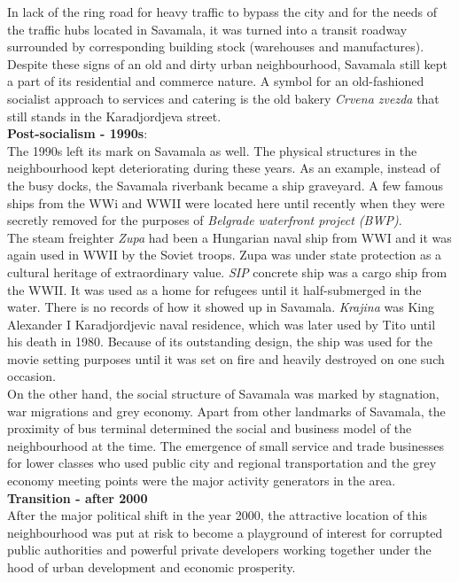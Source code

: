 \documentclass[11pt]{report}
\begin{document}
In lack of the ring road for heavy traffic to bypass the city and for the needs of the traffic hubs located in Savamala, it was turned into a transit roadway surrounded by corresponding building stock (warehouses and manufactures).
Despite these signs of an old and dirty urban neighbourhood, Savamala still kept a part of its residential and commerce nature.
A symbol for an old-fashioned socialist approach to services and catering is the old bakery \textit{Crvena zvezda} that still stands in the Karadjordjeva street.
\\
\textbf{Post-socialism - 1990s}:
\\
The 1990s left its mark on Savamala as well.
The physical structures in the neighbourhood kept deteriorating during these years. 
As an example, instead of the busy docks, the Savamala riverbank became a ship graveyard.
A few famous ships from the WWi and WWII were located here until recently when they were secretly removed for the purposes of \textit{Belgrade waterfront project (BWP)}.
\\
The steam freighter \textit{Zupa} had been a Hungarian naval ship from WWI and it was again used in WWII by the Soviet troops. Zupa was under state protection as a cultural heritage of extraordinary value.
\textit{SIP} concrete ship was a cargo ship from the WWII. It was used as a home for refugees until it half-submerged in the water. There is no records of how it showed up in Savamala. 
\textit{Krajina} was King Alexander I Karadjordjevic naval residence, which was later used by Tito until his death in 1980.
Because of its outstanding design, the ship was used for the movie setting purposes until it was set on fire and heavily destroyed on one such occasion.
\\
On the other hand, the social structure of Savamala was marked by stagnation, war migrations and grey economy. Apart from other landmarks of Savamala, the proximity of bus terminal determined the social and business model of the neighbourhood at the time.
The emergence of small service and trade businesses for lower classes who used public city and regional transportation and the grey economy meeting points were the major activity generators in the area.
\\
\textbf{Transition - after 2000}
\\
After the major political shift in the year 2000, the attractive location of this neighbourhood was put at risk to become a playground of interest for corrupted public authorities and powerful private developers working together under the hood of urban development and economic prosperity.
\end{document}
